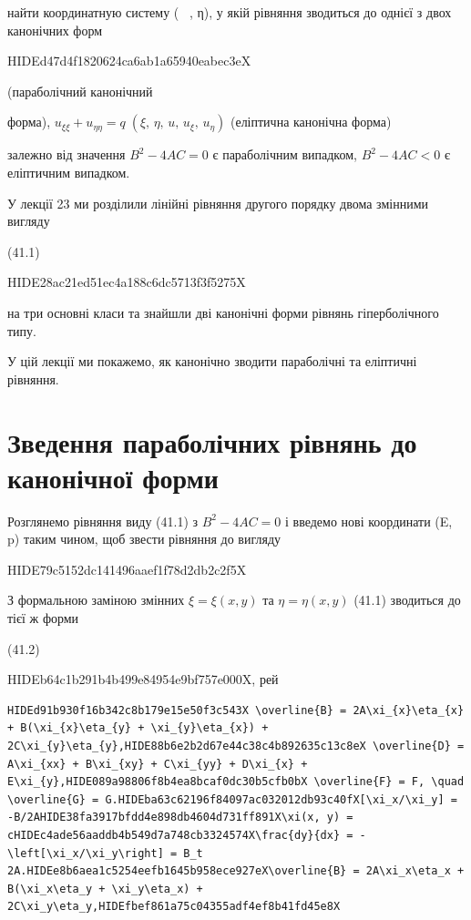 \documentclass[
  ukrainian,
]{article}
\begin{document}
найти координатную систему (~ , η), у якій рівняння зводиться до однієї
з двох канонічних форм

HIDEd47d4f1820624ca6ab1a65940eabec3eX

(параболічний канонічний

форма),
\(u_{\xi\xi} + u_{\eta\eta} = q \; (\xi, \, \eta, \, u, \, u_{\xi}, \, u_{\eta})\)
(еліптична канонічна форма)

залежно від значення \(B^{2} - 4AC = 0\) є параболічним випадком,
\(B^2 - 4AC < 0\) є еліптичним випадком.

У лекції 23 ми розділили лінійні рівняння другого порядку двома змінними
вигляду

(41.1)

HIDE28ac21ed51ec4a188c6dc5713f3f5275X

на три основні класи та знайшли дві канонічні форми рівнянь
гіперболічного типу.

У цій лекції ми покажемо, як канонічно зводити параболічні та еліптичні
рівняння.

\section{Зведення параболічних рівнянь до канонічної
форми}\label{ux437ux432ux435ux434ux435ux43dux43dux44f-ux43fux430ux440ux430ux431ux43eux43bux456ux447ux43dux438ux445-ux440ux456ux432ux43dux44fux43dux44c-ux434ux43e-ux43aux430ux43dux43eux43dux456ux447ux43dux43eux457-ux444ux43eux440ux43cux438}

Розглянемо рівняння виду (41.1) з \(B^2 - 4AC = 0\) і введемо нові
координати (E, p) таким чином, щоб звести рівняння до вигляду

HIDE79c5152dc141496aaef1f78d2db2c2f5X

З формальною заміною змінних \(\xi = \xi(x, y)\) та
\(\eta = \eta(x, y)\) (41.1) зводиться до тієї ж форми

(41.2)

HIDEb64c1b291b4b499e84954e9bf757e000X, рей

\begin{verbatim}
HIDEd91b930f16b342c8b179e15e50f3c543X \overline{B} = 2A\xi_{x}\eta_{x} + B(\xi_{x}\eta_{y} + \xi_{y}\eta_{x}) + 2C\xi_{y}\eta_{y},HIDE88b6e2b2d67e44c38c4b892635c13c8eX \overline{D} = A\xi_{xx} + B\xi_{xy} + C\xi_{yy} + D\xi_{x} + E\xi_{y},HIDE089a98806f8b4ea8bcaf0dc30b5cfb0bX \overline{F} = F, \quad \overline{G} = G.HIDEba63c62196f84097ac032012db93c40fX[\xi_x/\xi_y] = -B/2AHIDE38fa3917bfdd4e898db4604d731ff891X\xi(x, y) = cHIDEc4ade56aaddb4b549d7a748cb3324574X\frac{dy}{dx} = -\left[\xi_x/\xi_y\right] = B_t 2A.HIDEe8b6aea1c5254eefb1645b958ece927eX\overline{B} = 2A\xi_x\eta_x + B(\xi_x\eta_y + \xi_y\eta_x) + 2C\xi_y\eta_y,HIDEfbef861a75c04355adf4ef8b41fd45e8X
\end{verbatim}
\end{document}
